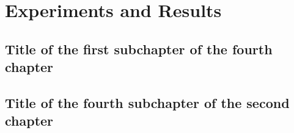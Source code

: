 \chapter{Experiments and Results}
\label{ChapterExperimentsAndResults}

\section{Title of the first subchapter of the fourth chapter}

\section{Title of the fourth subchapter of the second chapter}
